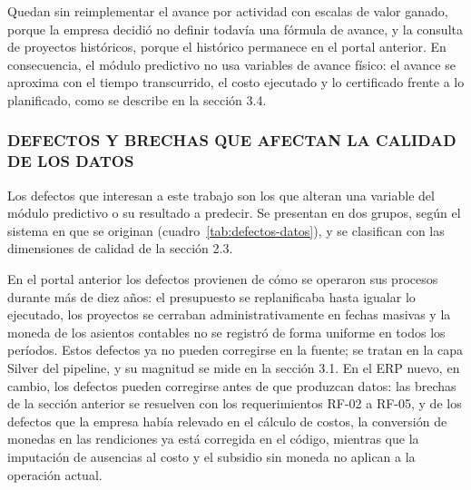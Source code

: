 Quedan sin reimplementar el avance por actividad con escalas de valor ganado, porque la empresa decidió no definir todavía una fórmula de avance, y la consulta de proyectos históricos, porque el histórico permanece en el portal anterior. En consecuencia, el módulo predictivo no usa variables de avance físico: el avance se aproxima con el tiempo transcurrido, el costo ejecutado y lo certificado frente a lo planificado, como se describe en la sección 3.4.

\subsubsection{DEFECTOS Y BRECHAS QUE AFECTAN LA CALIDAD DE LOS DATOS}

Los defectos que interesan a este trabajo son los que alteran una variable del módulo predictivo o su resultado a predecir. Se presentan en dos grupos, según el sistema en que se originan (cuadro~\ref{tab:defectos-datos}), y se clasifican con las dimensiones de calidad de la sección 2.3.

En el portal anterior los defectos provienen de cómo se operaron sus procesos durante más de diez años: el presupuesto se replanificaba hasta igualar lo ejecutado, los proyectos se cerraban administrativamente en fechas masivas y la moneda de los asientos contables no se registró de forma uniforme en todos los períodos. Estos defectos ya no pueden corregirse en la fuente; se tratan en la capa Silver del pipeline, y su magnitud se mide en la sección 3.1. En el ERP nuevo, en cambio, los defectos pueden corregirse antes de que produzcan datos: las brechas de la sección anterior se resuelven con los requerimientos RF-02 a RF-05, y de los defectos que la empresa había relevado en el cálculo de costos, la conversión de monedas en las rendiciones ya está corregida en el código, mientras que la imputación de ausencias al costo y el subsidio sin moneda no aplican a la operación actual.

